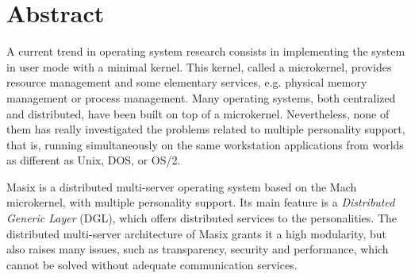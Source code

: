 
\setpapersizeUSletter




\newcommand {\figps} [4]
{
    \begin{figure} [ht]
       \begin{center}
		\leavevmode
                \epsfxsize=#2
                \epsfysize=#3
                \epsfbox {#1.ps}
        	\caption {#4}
        	\label {fig:#1}
        \end{center}
    \end{figure}
}




\IEEEheader

\section*{Abstract}

	A current trend in operating system research consists in implementing
	the system in user mode with a minimal kernel. This kernel, called a
	microkernel, provides resource management and some elementary 
	services, e.g. physical memory management or process management.
	Many operating systems, both centralized and distributed, 
	have been built on top of a microkernel.
	Nevertheless, none of them has really investigated the problems 
	related to multiple personality support, that is, running 
	simultaneously on the same workstation applications from worlds 
	as different as Unix, DOS, or OS/2.

        Masix is a distributed multi-server operating 
	system based on the Mach microkernel, with multiple personality 
	support. 
        Its main feature is a {\it Distributed Generic Layer} (DGL), 
        which offers distributed services to the personalities. 
        The distributed multi-server architecture of Masix  
        grants it a high modularity, but also raises many issues, 
	such as transparency, security and performance, which 
        cannot be solved without adequate communication services. 

